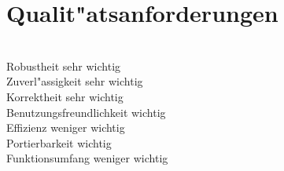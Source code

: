 ﻿\section{Qualit"atsanforderungen}


\begin{description}
\begin{tabbing}

	\noindent\hspace*{50mm} \= \\
	Robustheit \>  sehr wichtig \\ 
	Zuverl"assigkeit \> sehr wichtig \\
	Korrektheit	\> sehr wichtig \\
	Benutzungsfreundlichkeit \> wichtig \\
	Effizienz \> weniger wichtig \\
	Portierbarkeit \> wichtig \\
	Funktionsumfang	\> weniger wichtig
\end{tabbing}
\end{description}
